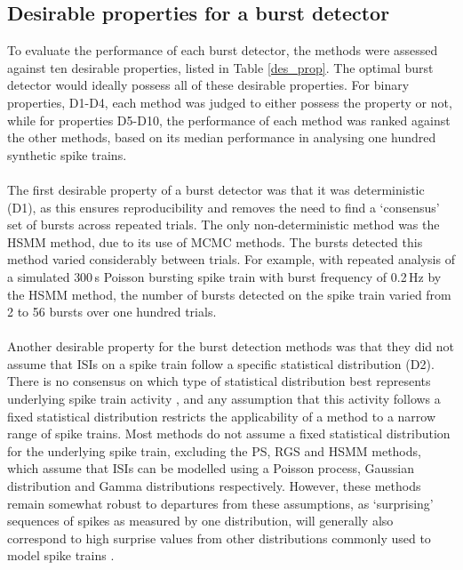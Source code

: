 \documentclass[12pt, titlepage]{article}
\begin{document}
\subsection*{Desirable properties for a burst detector}
 To evaluate the performance of each burst detector, the methods were assessed against ten desirable properties, listed in Table \ref{des_prop}. The optimal burst detector would ideally possess all of these desirable properties. For binary properties, D1-D4, each method was judged to either possess the property or not, while for properties D5-D10, the performance of each method was ranked against the other methods, based on its median performance in analysing one hundred synthetic spike trains. 
\\ \\ The first desirable property of a burst detector was that it was deterministic (D1), as this ensures reproducibility and removes the need to find a `consensus' set of bursts across repeated trials. The only non-deterministic method was the HSMM method, due to its use of MCMC methods. The bursts detected this method varied considerably between trials. For example, with repeated analysis of a simulated $300\,$s Poisson bursting spike train with burst frequency of 0.2$\,$Hz by the HSMM method, the number of bursts detected on the spike train varied from 2 to 56 bursts over one hundred trials. 
\\ \\ Another desirable property for the burst detection methods was that they did not assume that ISIs on a spike train follow a specific statistical distribution (D2). There is no consensus on which type of statistical distribution best represents underlying spike train activity%
, and any assumption that this activity follows a fixed statistical distribution restricts the applicability of a method to a narrow range of spike trains. Most methods do not assume a fixed statistical distribution for the underlying spike train, excluding the PS, RGS and HSMM methods, which assume that ISIs can be modelled using a Poisson process, Gaussian distribution and Gamma distributions respectively. However, these methods remain somewhat robust to departures from these assumptions, as `surprising' sequences of spikes as measured by one distribution, will generally also correspond to high surprise values from other distributions commonly used to model spike trains \cite{Legendy1985}. 
\end{document}
